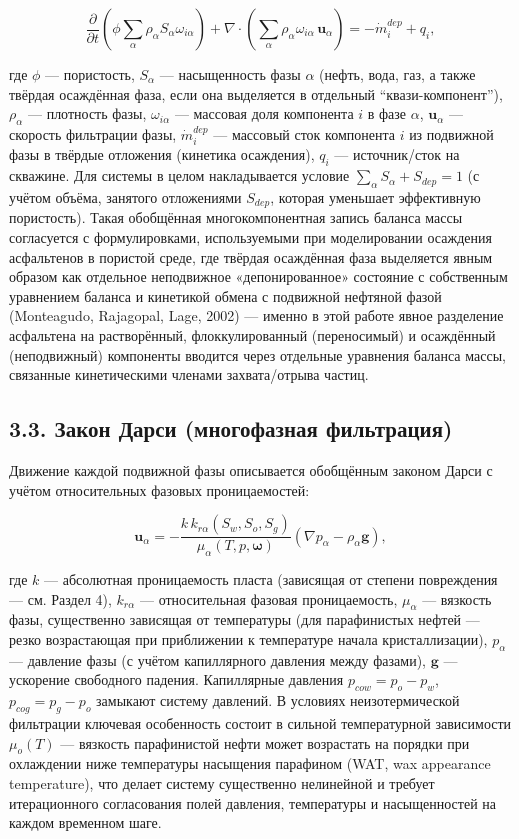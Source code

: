 \documentclass[11pt]{extarticle}
\begin{document}
\[
\frac{\partial}{\partial t}\left(\phi \sum_{\alpha} \rho_\alpha S_\alpha \omega_{i\alpha}\right) + \nabla\cdot\left(\sum_\alpha \rho_\alpha \omega_{i\alpha}\, \mathbf{u}_\alpha\right) = -\dot{m}_i^{dep} + q_i,
\]

где \(\phi\) --- пористость, \(S_\alpha\) --- насыщенность фазы \(\alpha\) (нефть, вода, газ, а также твёрдая осаждённая фаза, если она выделяется в отдельный ``квази-компонент''), \(\rho_\alpha\) --- плотность фазы, \(\omega_{i\alpha}\) --- массовая доля компонента \(i\) в фазе \(\alpha\), \(\mathbf{u}_\alpha\) --- скорость фильтрации фазы, \(\dot{m}_i^{dep}\) --- массовый сток компонента \(i\) из подвижной фазы в твёрдые отложения (кинетика осаждения), \(q_i\) --- источник/сток на скважине. Для системы в целом накладывается условие \(\sum_\alpha S_\alpha + S_{dep}=1\) (с учётом объёма, занятого отложениями \(S_{dep}\), которая уменьшает эффективную пористость). Такая обобщённая многокомпонентная запись баланса массы согласуется с формулировками, используемыми при моделировании осаждения асфальтенов в пористой среде, где твёрдая осаждённая фаза выделяется явным образом как отдельное неподвижное «депонированное» состояние с собственным уравнением баланса и кинетикой обмена с подвижной нефтяной фазой (Monteagudo, Rajagopal, Lage, 2002) --- именно в этой работе явное разделение асфальтена на растворённый, флоккулированный (переносимый) и осаждённый (неподвижный) компоненты вводится через отдельные уравнения баланса массы, связанные кинетическими членами захвата/отрыва частиц.

\subsection{3.3. Закон Дарси (многофазная фильтрация)}\label{ux437ux430ux43aux43eux43d-ux434ux430ux440ux441ux438-ux43cux43dux43eux433ux43eux444ux430ux437ux43dux430ux44f-ux444ux438ux43bux44cux442ux440ux430ux446ux438ux44f}

Движение каждой подвижной фазы описывается обобщённым законом Дарси с учётом относительных фазовых проницаемостей:

\[
\mathbf{u}_\alpha = -\frac{k\, k_{r\alpha}(S_w, S_o, S_g)}{\mu_\alpha(T, p, \mathbf{\omega})}\left(\nabla p_\alpha - \rho_\alpha \mathbf{g}\right),
\]

где \(k\) --- абсолютная проницаемость пласта (зависящая от степени повреждения --- см. Раздел 4), \(k_{r\alpha}\) --- относительная фазовая проницаемость, \(\mu_\alpha\) --- вязкость фазы, существенно зависящая от температуры (для парафинистых нефтей --- резко возрастающая при приближении к температуре начала кристаллизации), \(p_\alpha\) --- давление фазы (с учётом капиллярного давления между фазами), \(\mathbf{g}\) --- ускорение свободного падения. Капиллярные давления \(p_{cow}=p_o-p_w\), \(p_{cog}=p_g-p_o\) замыкают систему давлений. В условиях неизотермической фильтрации ключевая особенность состоит в сильной температурной зависимости \(\mu_o(T)\) --- вязкость парафинистой нефти может возрастать на порядки при охлаждении ниже температуры насыщения парафином (WAT, wax appearance temperature), что делает систему существенно нелинейной и требует итерационного согласования полей давления, температуры и насыщенностей на каждом временном шаге.
\end{document}
